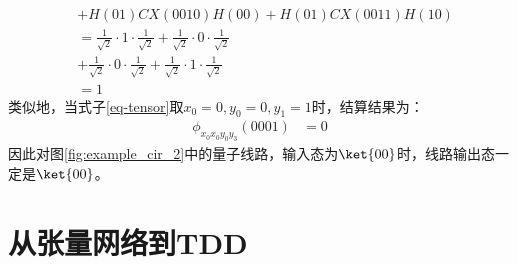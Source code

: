 \begin{example}
\begin{equation}
\begin{aligned}
        &+H\left(01\right)CX\left(0010\right)H\left(00\right)+H\left(01\right)CX\left(0011\right)H\left(10\right)\\
        &=\frac{1}{\sqrt{2}}\cdot 1 \cdot \frac{1}{\sqrt{2}}+\frac{1}{\sqrt{2}}\cdot 0 \cdot\frac{1}{\sqrt{2}}\\
        &+\frac{1}{\sqrt{2}}\cdot 0 \cdot \frac{1}{\sqrt{2}}+\frac{1}{\sqrt{2}}\cdot 1 \cdot\frac{1}{\sqrt{2}}\\
        &= 1
    \end{aligned}
    \label{eq-ex_cal_1}
\end{equation}
类似地，当式子\ref{eq-tensor}取\(x_0 = 0, y_0 = 0, y_1 = 1\)时，结算结果为：
\begin{equation}
    \begin{aligned}
\phi_{x_0x_0y_0y_3}\left(0001\right)&=0
    \end{aligned}
\end{equation}
因此对图\ref{fig:example_cir_2}中的量子线路，输入态为\(\ket{00}\)时，线路输出态一定是\(\ket{00}\)。
\end{example}
\section{从张量网络到TDD}
